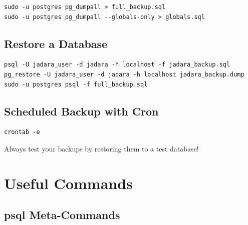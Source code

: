 \documentclass[11pt,a4paper]{article}
\begin{document}
\begin{lstlisting}[style=shell]
sudo -u postgres pg_dumpall > full_backup.sql
sudo -u postgres pg_dumpall --globals-only > globals.sql
\end{lstlisting}

\subsection{Restore a Database}

\begin{lstlisting}[style=shell]
psql -U jadara_user -d jadara -h localhost -f jadara_backup.sql
pg_restore -U jadara_user -d jadara -h localhost jadara_backup.dump
sudo -u postgres psql -f full_backup.sql
\end{lstlisting}

\subsection{Scheduled Backup with Cron}

\begin{lstlisting}[style=shell]
crontab -e
\end{lstlisting}

\begin{warningbox}
Always test your backups by restoring them to a test database!
\end{warningbox}

\section{Useful Commands}

\subsection{psql Meta-Commands}
\end{document}

